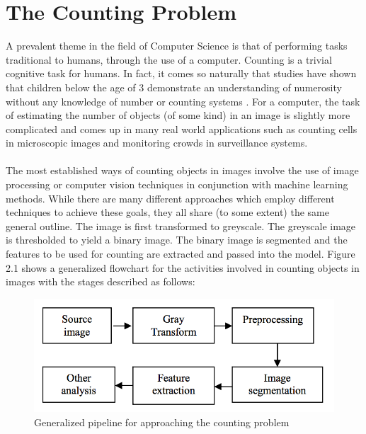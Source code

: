 \section{The Counting Problem}
A prevalent theme in the field of Computer Science is that of performing tasks traditional to humans, through the use of a computer. Counting is a trivial cognitive task for humans. In fact, it comes so naturally that studies have shown that children below the age of 3 demonstrate an understanding of numerosity without any knowledge of number or counting systems \cite{REF1}. For a computer, the task of estimating the number of objects (of some kind) in an image is slightly more complicated and comes up in many real world applications such as counting cells in microscopic images and monitoring crowds in surveillance systems.\\ \\
%
The most established ways of counting objects in images involve the use of image processing or computer vision techniques in conjunction with machine learning methods. While there are many different approaches which employ different techniques to achieve these goals, they all share (to some extent) the same general outline. The image is first transformed to greyscale. The greyscale image is thresholded to yield a binary image. The binary image is segmented and the features to be used for counting are extracted and passed into the model. Figure 2.1 shows a generalized flowchart for the activities involved in counting objects in images with the stages described as follows:\\
\begin{figure}[ht!]
\centering
\includegraphics[scale=0.5]{Images/general_pipeline}
\caption{Generalized pipeline for approaching the counting problem}
\label{fig:columnfigure}
\end{figure}

